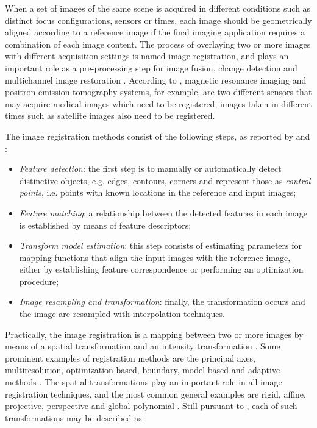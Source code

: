 When a set of images of the same scene is acquired in different conditions such as distinct focus configurations, sensors or times, each image should be geometrically aligned according to a reference image if the final imaging application requires a combination of each image content. The process of overlaying two or more images with different acquisition settings is named image registration, and plays an important role as a pre-processing step for image fusion, change detection and multichannel image restoration \cite{zitova2003image}. According to , magnetic resonance imaging and positron emission tomography systems, for example, are two different sensors that may acquire medical images which need to be registered; images taken in different times such as satellite images also need to be registered.

The image registration methods consist of the following steps, as reported by  and :

\begin{itemize}
    \item \emph{Feature detection}: the first step is to manually or automatically detect distinctive objects, e.g. edges, contours, corners and represent those as \emph{control points}, i.e. points with known locations in the reference and input images;

    \item \emph{Feature matching}: a relationship between the detected features in each image is established by means of feature descriptors;

    \item \emph{Transform model estimation}: this step consists of estimating parameters for mapping functions that align the input images with the reference image, either by establishing feature correspondence or performing an optimization procedure;

    \item \emph{Image resampling and transformation}: finally, the transformation occurs and the image are resampled with interpolation techniques.

\end{itemize}

Practically, the image registration is a mapping between two or more images by means of a spatial transformation and an intensity transformation \cite{brown1992survey}. Some prominent examples of registration methods are the principal axes, multiresolution, optimization-based, boundary, model-based and adaptive methods  \cite{goshtasby2012image}. The spatial transformations play an important role in all image registration techniques, and the most common general examples are rigid, affine, projective, perspective and global polynomial \cite{brown1992survey}. Still pursuant to , each of such transformations may be described as:

